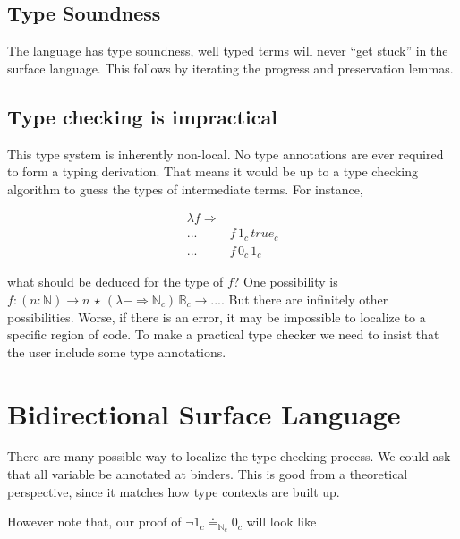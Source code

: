 \subsection{Type Soundness}

The language has type soundness, well typed terms will never ``get stuck'' in the surface language.
This follows by iterating the progress and preservation lemmas.




\subsection{Type checking is impractical}

This type system is inherently non-local.
No type annotations are ever required to form a typing derivation.
That means it would be up to a type checking algorithm to guess the types of intermediate terms.
For instance, 

\begin{align*}
\lambda f\Rightarrow & \,\\
... & f\,1_{c}\,true_{c}\\
... & f\,0_{c}\,1_{c}
\end{align*}
  
what should be deduced for the type of $f$? One possibility is $f:\left(n:\mathbb{N}\right)\rightarrow n\,\star\,\left(\lambda-\Rightarrow\mathbb{N}_{c}\right)\,\mathbb{B}_{c}\rightarrow...$.
But there are infinitely other possibilities.
Worse, if there is an error, it may be impossible to localize to a specific region of code.
To make a practical type checker we need to insist that the user include some type annotations.

\section{Bidirectional Surface Language}


There are many possible way to localize the type checking process.
We could ask that all variable be annotated at binders.
This is good from a theoretical perspective, since it matches how type contexts are built up.

However note that, our proof of $\lnot1_{c}\doteq_{\mathbb{N}_{c}}0_{c}$ will look like

